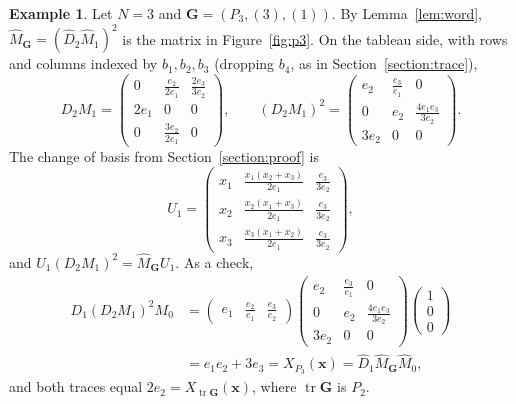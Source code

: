 \documentclass[12pt]{article}
\theoremstyle{plain}
\theoremstyle{definition}
\newtheorem{example}[theorem]{Example}
\theoremstyle{remark}
\newcommand{\bG}{\mathbf{G}}
\begin{document}
\begin{example}\label{ex:p3}
Let $N=3$ and $\bG=(P_3,(3),(1))$. By Lemma~\ref{lem:word}, $\hat M_\bG=(\hat D_2\hat M_1)^2$ is the matrix in Figure~\ref{fig:p3}. On the tableau side, with rows and columns indexed by $b_1,b_2,b_3$ (dropping $b_4$, as in Section~\ref{section:trace}),
\[
D_2M_1=\begin{pmatrix}0&\frac{e_2}{2e_1}&\frac{2e_3}{3e_2}\\[2pt]2e_1&0&0\\[2pt]0&\frac{3e_2}{2e_1}&0\end{pmatrix},\qquad
(D_2M_1)^2=\begin{pmatrix}e_2&\frac{e_3}{e_1}&0\\[2pt]0&e_2&\frac{4e_1e_3}{3e_2}\\[2pt]3e_2&0&0\end{pmatrix}.
\]
The change of basis from Section~\ref{section:proof} is
\[
U_1=\begin{pmatrix}
x_1&\frac{x_1(x_2+x_3)}{2e_1}&\frac{e_3}{3e_2}\\[2pt]
x_2&\frac{x_2(x_1+x_3)}{2e_1}&\frac{e_3}{3e_2}\\[2pt]
x_3&\frac{x_3(x_1+x_2)}{2e_1}&\frac{e_3}{3e_2}
\end{pmatrix},
\]
and $U_1(D_2M_1)^2=\hat M_\bG U_1$. As a check,
\begin{align*}
D_1(D_2M_1)^2M_0&=\begin{pmatrix}e_1&\frac{e_2}{e_1}&\frac{e_3}{e_2}\end{pmatrix}\begin{pmatrix}e_2&\frac{e_3}{e_1}&0\\[2pt]0&e_2&\frac{4e_1e_3}{3e_2}\\[2pt]3e_2&0&0\end{pmatrix}\begin{pmatrix}1\\0\\0\end{pmatrix}\\
&=e_1e_2+3e_3=X_{P_3}(\bm x)=\hat D_1\hat M_\bG\hat M_0,
\end{align*}
and both traces equal $2e_2=X_{\operatorname{tr}\bG}(\bm x)$, where $\operatorname{tr}\bG$ is $P_2$.
\end{example}
\end{document}
